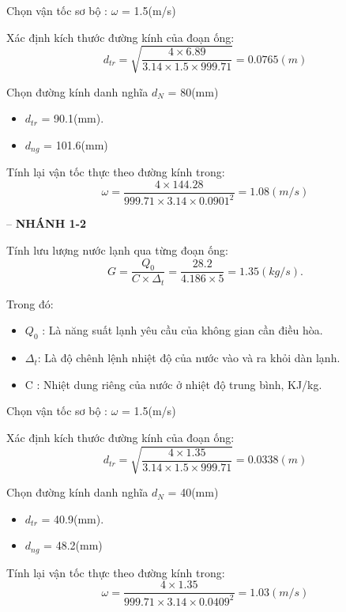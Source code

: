 Chọn vận tốc sơ bộ : $\omega$ = 1.5(m/s)

Xác định kích thước đường kính của đoạn ống:
\begin{equation*}
	d_{tr} = \sqrt{\dfrac{4 \times 6.89}{3.14 \times 1.5 \times 999.71}} = 0.0765(m)
\end{equation*}

Chọn đường kính danh nghĩa $d_{N}$ = 80(mm)
\begin{itemize}
	\item $d_{tr}$ = 90.1(mm).
	\item $d_{ng}$ = 101.6(mm)
\end{itemize}

Tính lại vận tốc thực theo đường kính trong:
\begin{equation*}
	\omega = \dfrac{4 \times 144.28 }{999.71 \times 3.14 \times 0.0901^{2}} = 1.08(m/s)
\end{equation*}

-- \textbf{NHÁNH 1-2}

Tính lưu lượng nước lạnh qua từng đoạn ống:
\begin{equation*}
	G = \dfrac{Q_{0}}{C \times \Delta_{t}} =\dfrac{28.2}{4.186 \times 5} = 1.35(kg/s).
\end{equation*}

Trong đó:
\begin{itemize}
	\item $Q_{0}$ : Là năng suất lạnh yêu cầu của không gian cần điều hòa.
	\item $\Delta_{t}$: Là độ chênh lệnh nhiệt độ của nước vào và ra khỏi dàn lạnh.
	\item C : Nhiệt dung riêng của nước ở nhiệt độ trung bình, KJ/kg.
\end{itemize}

Chọn vận tốc sơ bộ : $\omega$ = 1.5(m/s)

Xác định kích thước đường kính của đoạn ống:
\begin{equation*}
	d_{tr} = \sqrt{\dfrac{4 \times 1.35}{3.14 \times 1.5 \times 999.71}} = 0.0338(m)
\end{equation*}

Chọn đường kính danh nghĩa $d_{N}$ = 40(mm)
\begin{itemize}
	\item $d_{tr}$ = 40.9(mm).
	\item $d_{ng}$ = 48.2(mm)
\end{itemize}

Tính lại vận tốc thực theo đường kính trong:
\begin{equation*}
	\omega = \dfrac{4 \times 1.35 }{999.71 \times 3.14 \times 0.0409^{2}} = 1.03(m/s)
\end{equation*}

